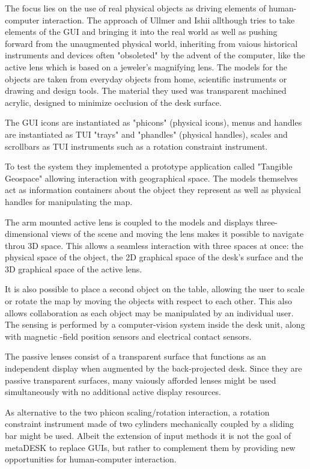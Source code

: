 The focus lies on the use of real physical objects as driving elements of human-computer interaction. The approach of Ullmer and Ishii allthough tries to take elements of the GUI and bringing it into the real world as well as pushing forward from the unaugmented physical world, inheriting from vaious historical instruments and devices often "obsoleted" by the advent of the computer, like the active lens which is based on a jeweler's magnifying lens. The models for the objects are taken from everyday objects from home, scientific instruments or drawing and design tools. The material they used was transparent machined acrylic, designed to minimize occlusion of the desk surface.

The GUI icons are instantiated as "phicons" (physical icons), menus and handles are instantiated as TUI "trays" and "phandles" (physical handles), scales and scrollbars as TUI instruments such as a rotation constraint instrument. 

To test the system they implemented a prototype application called "Tangible Geospace" allowing interaction with geographical space.
The models themselves act as information containers about the object they represent as well as physical handles for manipulating the map.

The arm mounted active lens is coupled to the models and displays three-dimensional views of the scene and moving the lens makes it possible to navigate throu 3D space. This allows a seamless interaction with three spaces at once: the physical space of the object, the 2D graphical space of the desk's surface and the 3D graphical space of the active lens.

It is also possible to place a second object on the table, allowing the user to scale or rotate the map by moving the objects with respect to each other. This also allows collaboration as each object may be manipulated by an individual user. The sensing is performed by a computer-vision system inside the desk unit, along with magnetic -field position sensors and electrical contact sensors.

The passive lenses consist of a transparent surface that functions as an independent display when augmented by the back-projected desk. Since they are passive transparent surfaces, many vaiously afforded lenses might be used simultaneously with no additional active display resources.

As alternative to the two phicon scaling/rotation interaction, a rotation constraint instrument made of two cylinders mechanically coupled by a sliding bar might be used.
Albeit the extension of input methods it is not the goal of metaDESK to replace GUIs, but rather to complement them by providing new opportunities for human-computer interaction. 



